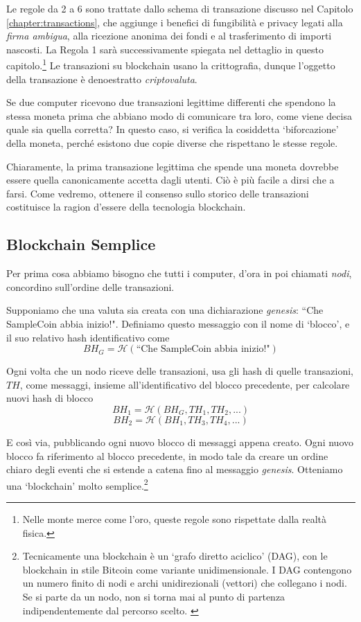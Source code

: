 Le regole da 2 a 6 sono trattate dallo schema di transazione discusso nel Capitolo \ref{chapter:transactions}, che aggiunge i benefici di fungibilità e privacy legati alla \emph{firma ambigua}, alla ricezione anonima dei fondi e al trasferimento di importi nascosti. La Regola 1 sarà successivamente spiegata nel dettaglio in questo capitolo.\footnote{Nelle monte merce come l’oro, queste regole sono rispettate dalla realtà fisica.} Le transazioni su blockchain usano la crittografia, dunque l'oggetto della transazione è denoestratto {\em criptovaluta}.

Se due computer ricevono due transazioni legittime differenti che spendono la stessa moneta prima che abbiano modo di comunicare tra loro, come viene decisa quale sia quella corretta? In questo caso, si verifica la cosiddetta ‘biforcazione’ della moneta, perché esistono due copie diverse che rispettano le stesse regole.

Chiaramente, la prima transazione legittima che spende una moneta dovrebbe essere quella canonicamente accetta dagli utenti. Ciò è più facile a dirsi che a farsi. Come vedremo, ottenere il consenso sullo storico delle transazioni costituisce la ragion d’essere della tecnologia blockchain.


\subsection{Blockchain Semplice}
\label{subsec:simple-blockchain}

Per prima cosa abbiamo bisogno che tutti i computer, d’ora in poi chiamati {\em nodi}, concordino sull’ordine delle transazioni.

Supponiamo che una valuta sia creata con una dichiarazione \emph{genesis}: ``Che SampleCoin abbia inizio!". Definiamo questo messaggio con il nome di `blocco', e il suo relativo hash identificativo come \vspace{.175cm}
\[\mathit{BH}_G = \mathcal{H}(\textrm{``Che SampleCoin abbia inizio!"})\]

Ogni volta che un nodo riceve delle transazioni, usa gli hash di quelle transazioni, $\mathit{TH}$, come messaggi, insieme all’identificativo del blocco precedente, per calcolare nuovi hash di blocco\vspace{.175cm}
\[\mathit{BH}_1 = \mathcal{H}(\mathit{BH}_G, \mathit{TH}_1, \mathit{TH}_2,...)\]
\[\mathit{BH}_2 = \mathcal{H}(\mathit{BH}_1, \mathit{TH}_3, \mathit{TH}_4,...)\]

E così via, pubblicando ogni nuovo blocco di messaggi appena creato. Ogni nuovo blocco fa riferimento al blocco precedente, in modo tale da creare un ordine chiaro degli eventi che si estende a catena fino al messaggio \emph{genesis}. Otteniamo una `blockchain' molto semplice.\footnote{Tecnicamente una blockchain è un `grafo diretto aciclico' (DAG), con le blockchain in stile Bitcoin come variante unidimensionale. I DAG contengono un numero finito di nodi e archi unidirezionali (vettori) che collegano i nodi. Se si parte da un nodo, non si torna mai al punto di partenza indipendentemente dal percorso scelto. \cite{DAG-wikipedia}}

